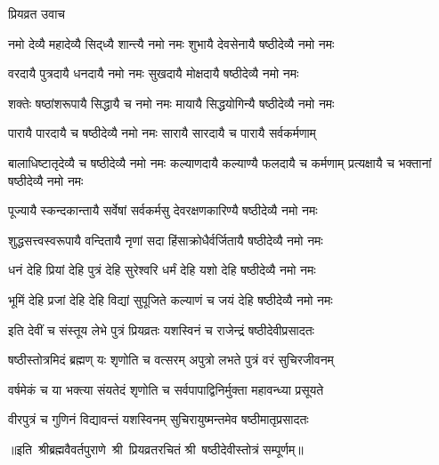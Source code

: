 
\centerline{प्रियव्रत उवाच}
\twolineshloka
{नमो देव्यै महादेव्यै सिद्‍ध्यै शान्त्यै नमो नमः}
{शुभायै देवसेनायै षष्ठीदेव्यै नमो नमः}%

\twolineshloka
{वरदायै पुत्रदायै धनदायै नमो नमः}
{सुखदायै मोक्षदायै षष्ठीदेव्यै नमो नमः}%

\twolineshloka
{शक्तेः षष्ठांशरूपायै सिद्धायै च नमो नमः}
{मायायै सिद्धयोगिन्यै षष्ठीदेव्यै नमो नमः}%

\twolineshloka
{पारायै पारदायै च षष्ठीदेव्यै नमो नमः}
{सारायै सारदायै च पारायै सर्वकर्मणाम्}%

\threelineshloka
{बालाधिष्टातृदेव्यै च षष्ठीदेव्यै नमो नमः}
{कल्याणदायै कल्याण्यै फलदायै च कर्मणाम्}
{प्रत्यक्षायै च भक्तानां षष्ठीदेव्यै नमो नमः}%

\twolineshloka
{पूज्यायै स्कन्दकान्तायै सर्वेषां सर्वकर्मसु}
{देवरक्षणकारिण्यै षष्ठीदेव्यै नमो नमः}%

\twolineshloka
{शुद्धसत्त्वस्वरूपायै वन्दितायै नृणां सदा}
{हिंसाक्रोधैर्वर्जितायै षष्ठीदेव्यै नमो नमः}%

\twolineshloka
{धनं देहि प्रियां देहि पुत्रं देहि सुरेश्वरि}
{धर्मं देहि यशो देहि षष्ठीदेव्यै नमो नमः}%

\twolineshloka
{भूमिं देहि प्रजां देहि देहि विद्यां सुपूजिते}
{कल्याणं च जयं देहि षष्ठीदेव्यै नमो नमः}%

\twolineshloka
{इति देवीं च संस्तूय लेभे पुत्रं प्रियव्रतः}
{यशस्विनं च राजेन्द्रं षष्ठीदेवीप्रसादतः}%

\twolineshloka
{षष्ठीस्तोत्रमिदं ब्रह्मण् यः शृणोति च वत्सरम्}
{अपुत्रो लभते पुत्रं वरं सुचिरजीवनम्}

\twolineshloka
{वर्षमेकं च या भक्त्या संयतेदं शृणोति च}
{सर्वपापाद्विनिर्मुक्ता महावन्ध्या प्रसूयते}

\twolineshloka
{वीरपुत्रं च गुणिनं विद्यावन्तं यशस्विनम्}
{सुचिरायुष्मन्तमेव षष्ठीमातृप्रसादतः}

{॥इति~श्रीब्रह्मवैवर्तपुराणे~श्री~प्रियव्रतरचितं श्री~षष्ठीदेवीस्तोत्रं सम्पूर्णम्॥}